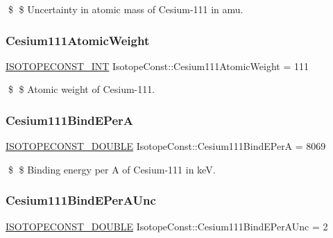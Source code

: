 \$ \$ Uncertainty in atomic mass of Cesium-\/111 in amu. \mbox{\label{group___isotope_const-_cesium-_cs111_gaa7efb33336130368b90be9e977cc2e1a}} 
\subsubsection{\texorpdfstring{Cesium111\+Atomic\+Weight}{Cesium111AtomicWeight}}
{\footnotesize\ttfamily \mbox{\hyperlink{group___isotope_const-_macros_ga5f18360b3e99483a35c32d789e62621c}{I\+S\+O\+T\+O\+P\+E\+C\+O\+N\+S\+T\+\_\+\+I\+NT}} Isotope\+Const\+::\+Cesium111\+Atomic\+Weight = 111}

\$ \$ Atomic weight of Cesium-\/111. \mbox{\label{group___isotope_const-_cesium-_cs111_ga6e437207f91f9042f9876f51be3a7fdd}} 
\subsubsection{\texorpdfstring{Cesium111\+Bind\+E\+PerA}{Cesium111BindEPerA}}
{\footnotesize\ttfamily \mbox{\hyperlink{group___isotope_const-_macros_ga8f45a7272ce02c0b4c65c44636ed719a}{I\+S\+O\+T\+O\+P\+E\+C\+O\+N\+S\+T\+\_\+\+D\+O\+U\+B\+LE}} Isotope\+Const\+::\+Cesium111\+Bind\+E\+PerA = 8069}

\$ \$ Binding energy per A of Cesium-\/111 in keV. \mbox{\label{group___isotope_const-_cesium-_cs111_gac463de0e0e43b9980b090a99b8818691}} 
\subsubsection{\texorpdfstring{Cesium111\+Bind\+E\+Per\+A\+Unc}{Cesium111BindEPerAUnc}}
{\footnotesize\ttfamily \mbox{\hyperlink{group___isotope_const-_macros_ga8f45a7272ce02c0b4c65c44636ed719a}{I\+S\+O\+T\+O\+P\+E\+C\+O\+N\+S\+T\+\_\+\+D\+O\+U\+B\+LE}} Isotope\+Const\+::\+Cesium111\+Bind\+E\+Per\+A\+Unc = 2}

